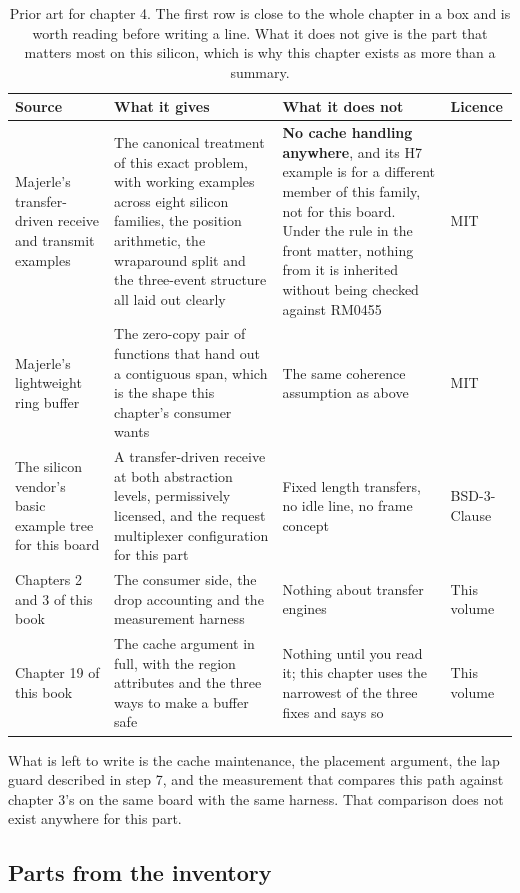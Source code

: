 \begin{table}[H]\centering\small
\begin{tabular}{p{34mm}p{46mm}p{38mm}p{20mm}}
\toprule
Source & What it gives & What it does not & Licence \\
\midrule
Majerle's transfer-driven receive and transmit examples & The canonical treatment of this exact problem, with working examples across eight silicon families, the position arithmetic, the wraparound split and the three-event structure all laid out clearly & \textbf{No cache handling anywhere}, and its H7 example is for a different member of this family, not for this board. Under the rule in the front matter, nothing from it is inherited without being checked against RM0455 & MIT \\
Majerle's lightweight ring buffer & The zero-copy pair of functions that hand out a contiguous span, which is the shape this chapter's consumer wants & The same coherence assumption as above & MIT \\
The silicon vendor's basic example tree for this board & A transfer-driven receive at both abstraction levels, permissively licensed, and the request multiplexer configuration for this part & Fixed length transfers, no idle line, no frame concept & BSD-3-Clause \\
Chapters 2 and 3 of this book & The consumer side, the drop accounting and the measurement harness & Nothing about transfer engines & This volume \\
Chapter 19 of this book & The cache argument in full, with the region attributes and the three ways to make a buffer safe & Nothing until you read it; this chapter uses the narrowest of the three fixes and says so & This volume \\
\bottomrule
\end{tabular}
\caption{Prior art for chapter 4. The first row is close to the whole chapter in a box and is worth reading before writing a line. What it does not give is the part that matters most on this silicon, which is why this chapter exists as more than a summary.}
\end{table}

What is left to write is the cache maintenance, the placement argument, the lap
guard described in step 7, and the measurement that compares this path against
chapter 3's on the same board with the same harness. That comparison does not
exist anywhere for this part.

\subsection*{Parts from the inventory}


